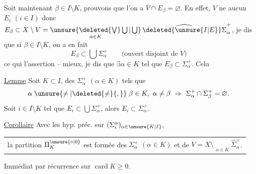 Soit maintenant $\beta\in I\setminus K$, prouvons que l'on a $\overline V\cap E_\beta=\varnothing$. En effet, $V$ ne   aucun $E_i$ $(i\in I)$ donc $E_\beta\subset X\setminus V=\mathop{\unsure{\deleted{\bigvee}\bigcup|\bigcup}}\limits_{\alpha\in K}\widehat{\deleted{\unsure{I|E}}\Sigma}_\alpha^+$,  je dis que si $\beta\in I\setminus K$, on a en fait
\[
E_\beta\subset\bigcup\Sigma_\alpha^+\qquad\text{(ouvert disjoint de }V\text{)}
\]
\reversemarginpar{}\normalmarginpar
ce qui  l'assertion -- mieux, je dis que $\exists\alpha\in K$ tel que $E_\beta\subset\Sigma_\alpha^+$. Cela  

\uline{Lemme} Soit $K\subset I$,   des $\Sigma_\alpha^+$ $(\alpha\in K)$ tels que
\[
\alpha\mathrel{\unsure{\ne|\deleted{\ne}{,}}}\beta\in K,\ \alpha\ne\beta\ \Rightarrow\ \Sigma_\alpha^+\cap\Sigma_\beta^+=\varnothing.
\]
Soit $i\in I\setminus K$ tel que $E_i\subset\bigcup\Sigma_\alpha^+$, alors   $E_i\subset\Sigma_\alpha^+$.

   

\uline{Corollaire} Avec les hyp. préc. sur $(\Sigma_i^\alpha)_{\alpha\in\unsure{K|I}}$,

\noindent\begin{tabular}{@{}|p{.96\linewidth}@{}}
la partition $\Pi_K^{\unsure{\circ|0}}$ est formée des $\Sigma_\alpha^+$ $(\alpha\in K)$ et de $V=X\setminus\mathop{\overline{\bigcup}}\limits_{\alpha\in K}\widehat{\Sigma}_\alpha^+$.
\end{tabular}

Immédiat par récurrence sur $\operatorname{card} K\geq 0$.
